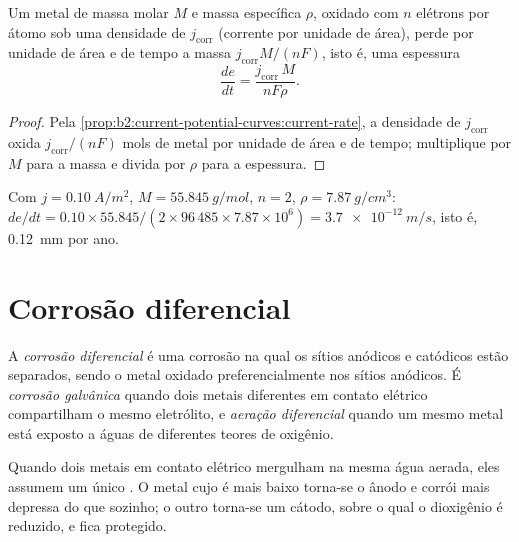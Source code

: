 \begin{proposition}\label{prop:b2:corrosion:rate}
Um metal de massa molar $M$ e massa específica $\rho$, oxidado com $n$
elétrons por átomo sob uma densidade de  $j_{\text{corr}}$
(corrente por unidade de área), perde por unidade de área e de tempo a massa
$j_{\text{corr}}M/(nF)$, isto é, uma espessura
\[
  \frac{de}{dt} = \frac{j_{\text{corr}}\,M}{nF\rho} .
\]
\end{proposition}

\begin{proof}
Pela \cref{prop:b2:current-potential-curves:current-rate}, a densidade de
 $j_{\text{corr}}$ oxida $j_{\text{corr}}/(nF)$ mols de metal por unidade de
área e de tempo; multiplique por $M$ para a massa e divida por $\rho$ para a espessura.
\end{proof}

\begin{example}\label{ex:b2:corrosion:rate}
Com $j = \qty{0.10}{A/m^2}$, $M = \qty{55.845}{g/mol}$, $n = 2$, $\rho =
\qty{7.87}{g/cm^3}$: $de/dt = 0.10 \times 55.845/(2 \times 96\,485 \times 7.87
\times 10^6) = \qty{3.7e-12}{m/s}$, isto é, \qty{0.12}{mm} por ano.
\end{example}

\section{Corrosão diferencial}

\begin{definition}\label{def:b2:corrosion:differential}
A \emph{corrosão diferencial} é uma corrosão na
qual os sítios anódicos e catódicos estão separados, sendo o metal oxidado
preferencialmente nos sítios anódicos. É \emph{corrosão
galvânica} quando dois metais diferentes em contato
elétrico compartilham o mesmo eletrólito, e \emph{aeração
diferencial} quando um mesmo metal está exposto a águas de
diferentes teores de oxigênio.
\end{definition}

\begin{proposition}\label{prop:b2:corrosion:galvanic}
Quando dois metais em contato elétrico mergulham na mesma água aerada, eles
assumem um único . O metal cujo  é mais
baixo torna-se o ânodo e corrói mais depressa do que sozinho; o outro
torna-se um cátodo, sobre o qual o dioxigênio é reduzido, e fica protegido.
\end{proposition}

